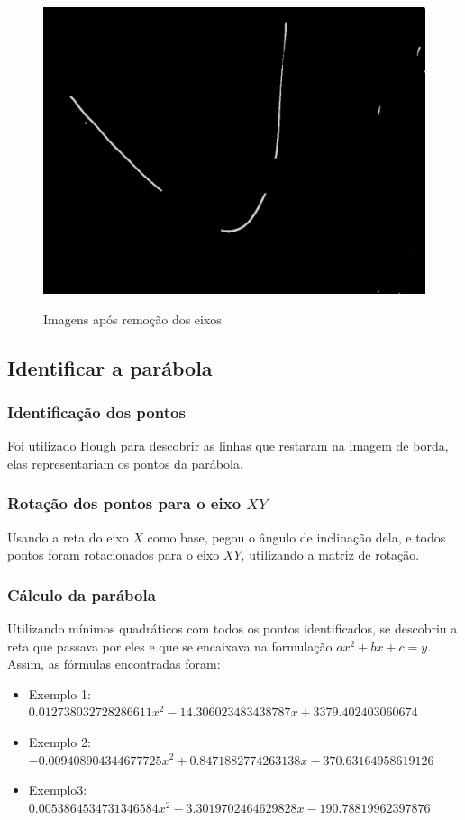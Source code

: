 \documentclass{article}
\begin{document}
\begin{figure}[h!]
        {\includegraphics[scale=0.1]{exemplo3WithoutAxis.jpg}}
    \caption{Imagens após remoção dos eixos }
    \end{figure}

\subsection{Identificar a parábola}

    \subsubsection{Identificação dos pontos}
    Foi utilizado Hough para descobrir as linhas que restaram na imagem de borda, elas representariam os pontos da parábola.
    \subsubsection{Rotação dos pontos para o eixo \(XY\)}
    Usando a reta do eixo \(X\) como base, pegou o ângulo de inclinação dela, e todos pontos foram rotacionados para o eixo \(XY\), utilizando a matriz de rotação.
    \subsubsection{Cálculo da parábola}
    Utilizando mínimos quadráticos com todos os pontos identificados, se descobriu a reta que passava por eles e que se encaixava na formulação \(ax^2 + bx + c = y\). Assim, as fórmulas encontradas foram:
   \begin{itemize}
       \item Exemplo 1:  \(0.012738032728286611x^2 -14.306023483438787x+3379.402403060674\)
       \item Exemplo 2: \(-0.009408904344677725x^2+0.8471882774263138x-370.63164958619126\)
       \item Exemplo3:  \(0.0053864534731346584x^2-3.3019702464629828x-190.78819962397876\)
   \end{itemize}
\end{document}
